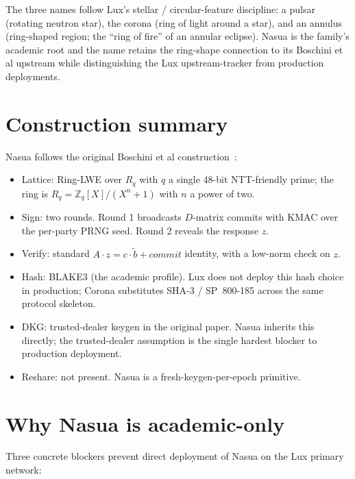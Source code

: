 \documentclass[11pt,a4paper]{article}
\theoremstyle{definition}
\theoremstyle{remark}
\newcommand{\Rq}{R_q}
\newcommand{\Zq}{\mathbb{Z}_q}
\begin{document}
The three names follow Lux's stellar / circular-feature
discipline: a pulsar (rotating neutron star), the corona (ring of
light around a star), and an annulus (ring-shaped region; the
``ring of fire'' of an annular eclipse). Nasua is the family's
academic root and the name retains the ring-shape connection to
its Boschini et al upstream while distinguishing the Lux upstream-tracker
from production deployments.

\section{Construction summary}
\label{sec:construction}

Nasua follows the original Boschini et al construction~\cite{ringtail}:

\begin{itemize}[leftmargin=*, itemsep=0pt]
\item Lattice: Ring-LWE over $\Rq$ with $q$ a single 48-bit
NTT-friendly prime; the ring is $\Rq = \Zq[X] / (X^n + 1)$ with $n$
a power of two.
\item Sign: two rounds. Round 1 broadcasts $D$-matrix commits with
KMAC over the per-party PRNG seed. Round 2 reveals the response
$z$.
\item Verify: standard $A \cdot z = c \cdot \tilde b + \mathit{commit}$
identity, with a low-norm check on $z$.
\item Hash: BLAKE3 (the academic profile). Lux does not deploy this
hash choice in production; Corona substitutes SHA-3 / SP~800-185
across the same protocol skeleton.
\item DKG: trusted-dealer keygen in the original paper. Nasua
inherits this directly; the trusted-dealer assumption is the
single hardest blocker to production deployment.
\item Reshare: not present. Nasua is a fresh-keygen-per-epoch
primitive.
\end{itemize}

\section{Why Nasua is academic-only}
\label{sec:academic-only}

Three concrete blockers prevent direct deployment of Nasua on the
Lux primary network:
\end{document}
